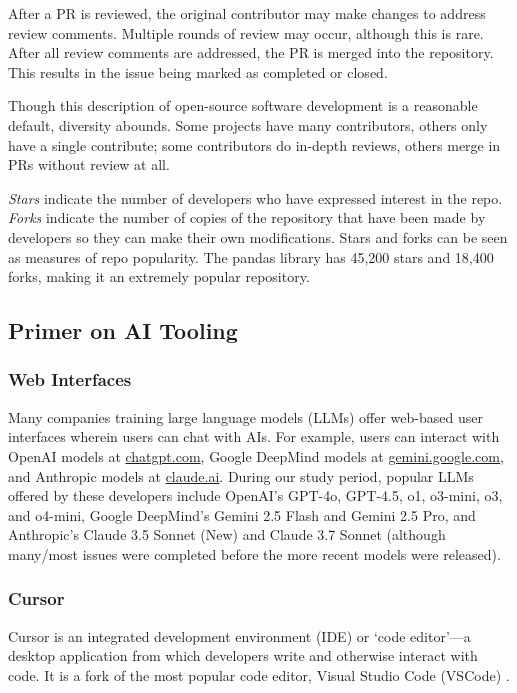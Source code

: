 \documentclass{article}
\begin{document}
After a PR is reviewed, the original contributor may make changes to address review comments. Multiple rounds of review may occur, although this is rare. After all review comments are addressed, the PR is merged into the repository. This results in the issue being marked as completed or closed.

Though this description of open-source software development is a reasonable default, diversity abounds. Some projects have many contributors, others only have a single contribute; some contributors do in-depth reviews, others merge in PRs without review at all.  

\textit{Stars} indicate the number of developers who have expressed interest in the repo. \textit{Forks} indicate the number of copies of the repository that have been made by developers so they can make their own modifications. Stars and forks can be seen as measures of repo popularity. The pandas library has 45,200 stars and 18,400 forks, making it an extremely popular repository.

\subsection{Primer on AI Tooling}
\label{sec:Primer on AI Tooling}

\subsubsection{Web Interfaces}

Many companies training large language models (LLMs) offer web-based user interfaces wherein users can chat with AIs. For example, users can interact with OpenAI models at \href{https://chatgpt.com/}{chatgpt.com}, Google DeepMind models at \href{https://gemini.google.com/}{gemini.google.com}, and Anthropic models at \href{https://claude.ai/}{claude.ai}. During our study period, popular LLMs offered by these developers include OpenAI’s GPT-4o, GPT-4.5, o1, o3-mini, o3, and o4-mini, Google DeepMind’s Gemini 2.5 Flash and Gemini 2.5 Pro, and Anthropic’s Claude 3.5 Sonnet (New) and Claude 3.7 Sonnet (although many/most issues were completed before the more recent models were released).

\subsubsection{Cursor}

Cursor is an integrated development environment (IDE) or `code editor'---a desktop application from which developers write and otherwise interact with code. It is a fork of the most popular code editor, Visual Studio Code (VSCode) \cite{stackoverflow2024}.
\end{document}
